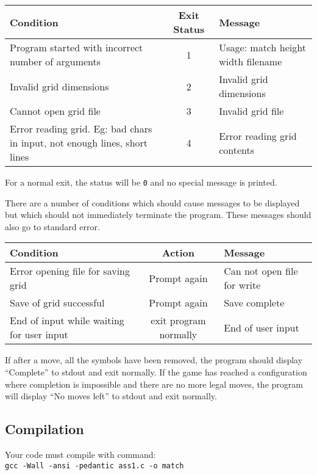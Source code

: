 \begin{center}
\begin{tabular}{|p{4cm}|c|p{5.5cm}|}\hline
\textbf{Condition} & \textbf{Exit Status} & \textbf{Message} \\\hline
Program started with incorrect number of arguments & 1 & Usage: match height width filename \\\hline
Invalid grid dimensions & 2 & Invalid grid dimensions \\\hline
Cannot open grid file& 3 & Invalid grid file \\\hline
Error reading grid. Eg: bad chars in input, not enough lines, short lines & 4 & Error reading grid contents \\\hline
\end{tabular}
\end{center}
For a normal exit, the status will be \texttt{0} and no special message is printed.

There are a number of conditions which should cause messages to be displayed but which should not immediately terminate the program.
These messages should also go to standard error.

\begin{center}
\begin{tabular}{|p{5.0cm}|c|p{4cm}|}\hline
\textbf{Condition} & \textbf{Action} & \textbf{Message} \\\hline
Error opening file for saving grid & Prompt again & Can not open file for write \\\hline
Save of grid successful & Prompt again & Save complete \\\hline
End of input while waiting for user input & exit program normally & End of user input \\\hline
\end{tabular}
\end{center}

If after a move, all the symbols have been removed, the program should display ``Complete'' to stdout and exit normally.
If the game has reached a configuration where completion is impossible and there are no more legal moves,
the program will display ``No moves left'' to stdout and exit normally.

\subsection{Compilation}
Your code must compile with command:\\
\texttt{gcc -Wall -ansi -pedantic ass1.c -o match}

